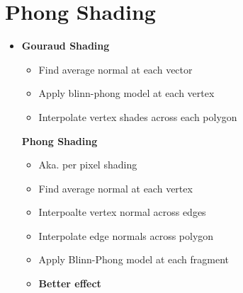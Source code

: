 \section{Phong Shading}

  \begin{itemize}
    \item \textbf{Gouraud Shading}
    \begin{itemize}
      \item Find average normal at each vector
      \item Apply blinn-phong model at each vertex
      \item Interpolate vertex shades across each polygon
    \end{itemize}

    \textbf{Phong Shading}
    \begin{itemize}
      \item Aka. per pixel shading
      \item Find average normal at each vertex
      \item Interpoalte vertex normal across edges
      \item Interpolate edge normals across polygon
      \item Apply Blinn-Phong model at each fragment
      \item \textbf{Better effect}
    \end{itemize}
  \end{itemize}

